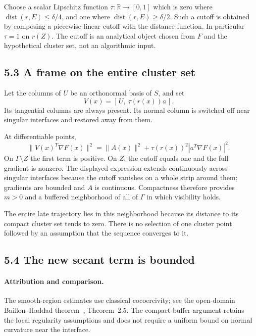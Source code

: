 Choose a scalar Lipschitz function \(\tau:\mathbb R\to[0,1]\) which is
zero where \(\operatorname{dist}(r,E)\le\delta/4\), and one where
\(\operatorname{dist}(r,E)\ge\delta/2\). Such a cutoff is obtained by
composing a piecewise-linear cutoff with the distance function. In
particular \(\tau=1\) on \(r(Z)\). The cutoff is an analytical object
chosen from \(F\) and the hypothetical cluster set, not an algorithmic
input.

\subsection{5.3 A frame on the entire cluster
set}\label{U:a-frame-on-the-entire-cluster-set}

Let the columns of \(U\) be an orthonormal basis of \(S\), and set \[
 \boxed{V(x)=[\,U,\ \tau(r(x))a\,].}\tag{U.12}
\] Its tangential columns are always present. Its normal column is
switched off near singular interfaces and restored away from them.

At differentiable points, \[
 \|V(x)^T\nabla F(x)\|^2
 =\|A(x)\|^2+\tau(r(x))^2|a^T\nabla F(x)|^2.
\] On \(\Gamma\setminus Z\) the first term is positive. On \(Z\), the
cutoff equals one and the full gradient is nonzero. The displayed
expression extends continuously across singular interfaces because the
cutoff vanishes on a whole strip around them; gradients are bounded and
\(A\) is continuous. Compactness therefore provides \(m>0\) and a
buffered neighborhood of all of \(\Gamma\) in which visibility holds.

The entire late trajectory lies in this neighborhood because its
distance to its compact cluster set tends to zero. There is no selection
of one cluster point followed by an assumption that the sequence
converges to it.

\subsection{5.4 The new secant term is
bounded}\label{U:the-new-secant-term-is-bounded}
\paragraph{Attribution and comparison.}
The smooth-region estimates use classical cocoercivity; see the open-domain Baillon--Haddad theorem~\cite{WW}, Theorem~2.5. The compact-buffer argument retains the local regularity assumptions and does not require a uniform bound on normal curvature near the interface.


